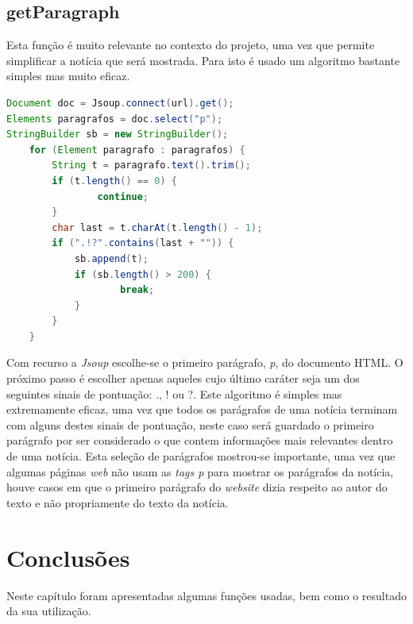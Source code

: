 \subsection{getParagraph}
\label{chap4:sec:paragraph}
Esta função é muito relevante no contexto do projeto, uma vez que permite simplificar a notícia que será mostrada.
Para isto é usado um algoritmo bastante simples mas muito eficaz.

\begin{lstlisting}[language=JAVA, caption = Código usado para destacar notícia \label{code:getparagraph}]
Document doc = Jsoup.connect(url).get();
Elements paragrafos = doc.select("p");
StringBuilder sb = new StringBuilder();
    for (Element paragrafo : paragrafos) {
        String t = paragrafo.text().trim();
        if (t.length() == 0) {
                continue;
        }
        char last = t.charAt(t.length() - 1);
        if (".!?".contains(last + "")) {
            sb.append(t);
            if (sb.length() > 200) {
                    break;
            }
        }
    }
\end{lstlisting}
Com recurso a \emph{Jsoup} escolhe-se o primeiro parágrafo, \emph{p}, do documento \ac{HTML}. O próximo passo é escolher apenas aqueles cujo último caráter seja um dos seguintes sinais de pontuação: ., ! ou ?.
Este algoritmo é simples mas extremamente eficaz, uma vez que todos os parágrafos de uma notícia terminam com alguns destes sinais de pontuação, neste caso será guardado o primeiro parágrafo por ser considerado o que contem informações mais relevantes dentro de uma notícia. Esta seleção de parágrafos mostrou-se importante, uma vez que algumas páginas \emph{web} não usam as \emph{tags p} para mostrar os parágrafos da notícia, houve casos em que o primeiro parágrafo do \emph{website} dizia respeito ao autor do texto e não propriamente do texto da notícia.

\section{Conclusões}
\label{chap4:sec:concs}
Neste capítulo foram apresentadas algumas funções usadas, bem como o resultado da sua utilização. 